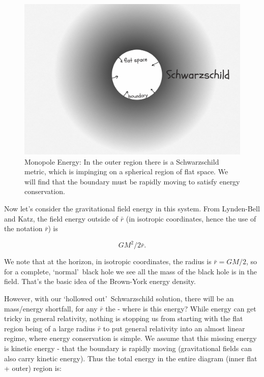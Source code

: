 \documentclass[../rzero]{subfiles}
\begin{document}
\begin{figure}\label{monopoleEnergy}
\includegraphics[width=\textwidth]{chapters/images/monopole-energy.jpg}
\caption{Monopole Energy: In the outer region there is a Schwarzschild metric, which is impinging on a spherical region of flat space. We will find that the boundary must be rapidly moving to satisfy energy conservation.}
\end{figure}


Now let's consider the gravitational field energy in this system. From Lynden-Bell and Katz\cite{lyndenbell1985}, the field energy outside of $\bar r$ (in isotropic coordinates, hence the use of the notation $\bar r$) is 

\begin{equation} \label{energyoutsideR}
 GM^2/2 \bar r .
\end{equation}

We note that at the horizon, in isotropic coordinates, the radius is $ \bar r = GM/2 $, so for a complete, \lq normal\rq\ black hole we see all the mass of the black hole is in the field. That's the basic idea of the Brown-York energy density.

However, with our \lq hollowed out\rq\ Schwarzschild solution, there will be an mass/energy shortfall, for any $\bar r$ the  - where is this energy? While energy can get tricky in general relativity, nothing is stopping us from starting with the flat region being of a large radius $\bar r$ to put general relativity into an almost linear regime, where energy conservation is simple. We assume that this missing energy is kinetic energy - that the boundary is rapidly moving (gravitational fields can also carry kinetic energy). Thus the total energy in the entire diagram (inner flat + outer) region is:
\end{document}
